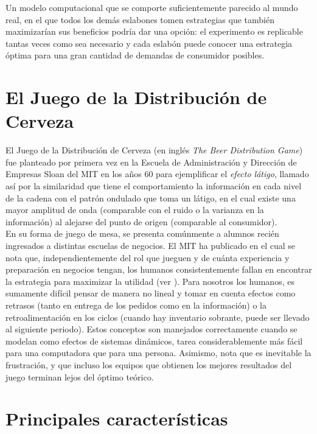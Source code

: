 Un modelo computacional que se comporte suficientemente parecido al mundo real, en el que todos los demás eslabones tomen estrategias que también maximizarían sus beneficios podría dar una opción: el experimento es replicable tantas veces como sea necesario y cada eslabón puede conocer una estrategia óptima para una gran cantidad de demandas de consumidor posibles.\\

\section{El Juego de la Distribuci\'on de Cerveza}

El Juego de la Distribuci\'on de Cerveza (en ingl\'es \textit{The Beer Distribution Game}) \cite{StermanArt} fue planteado por primera vez en la Escuela de Administraci\'on y Direcci\'on de Empresas Sloan del MIT en los años 60 para ejemplificar el \textit{efecto l\'atigo}, llamado as\'i por la similaridad que tiene el comportamiento la informaci\'on en cada nivel de la cadena con el patr\'on ondulado que toma un l\'atigo, en el cual existe una mayor amplitud de onda (comparable con el ruido o la varianza en la informaci\'on) al alejarse del punto de origen (comparable al consumidor). \\

En su forma de juego de mesa, se presenta com\'unmente a alumnos reci\'en ingresados a distintas escuelas de negocios. El MIT ha publicado en el cual se nota que, independientemente del rol que jueguen y de cu\'anta experiencia y preparaci\'on en negocios tengan, los humanos consistentemente fallan en encontrar la estrategia para maximizar la utilidad (ver \citet{Dizikes}). Para nosotros los humanos, es sumamente dif\'icil pensar de manera no lineal y tomar en cuenta efectos como retrasos (tanto en entrega de los pedidos como en la informaci\'on) o la retroalimentaci\'on en los ciclos (cuando hay inventario sobrante, puede ser llevado al siguiente periodo). Estos conceptos son manejados correctamente cuando se modelan como efectos de sistemas din\'amicos, tarea considerablemente m\'as f\'acil para una computadora que para una persona. Asimismo, nota que es inevitable la frustraci\'on, y que incluso los equipos que obtienen los mejores resultados del juego terminan lejos del \'optimo te\'orico.\\

\section{Principales caracter\'isticas}

